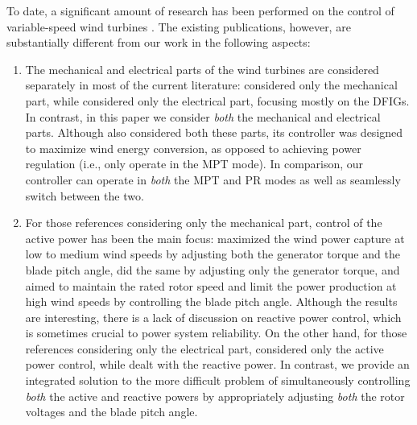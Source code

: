 \documentclass[journal]{IEEEtran}
\begin{document}
To date, a significant amount of research has been performed on the control of variable-speed wind turbines \cite{Prats00,Iyasere08,Johnson04b,Johnson06,Calderaro07,Galdi08,Chedid00,Beltran08,Malinga03,Hand99,ZhangL08,GengH09,Muljadi01,Senjyu06,Stol01,Wright03,Wright03b,ZhangJZ08,Janssens07,Tarnowski07,Ko07,Brekken03,Marinescu04,LiDD04,ZhiDW07,WuF08, Alegria04,Pena96,Hopfensperger00,Monroy08,Peresada04,Rabelo01,LiH06,Hansen04}. The existing publications, however, are substantially different from our work in the following aspects:
\begin{enumerate}
\itemsep-\parsep

\item The mechanical and electrical parts of the wind turbines are considered separately in most of the current literature: \cite{Iyasere08,Malinga03,Hand99,Chedid00,Prats00,Johnson04b,Johnson06,Beltran08,Galdi08,GengH09,Muljadi01,Senjyu06,Stol01,Wright03,Wright03b,ZhangL08,ZhangJZ08,Calderaro07} considered only the mechanical part, while \cite{Ko07,Janssens07,ZhiDW07,Marinescu04,Tarnowski07,WuF08,Pena96,Monroy08,Peresada04,LiDD04,Brekken03,Alegria04,Hopfensperger00,Rabelo01,LiH06} considered only the electrical part, focusing mostly on the DFIGs. In contrast, in this paper we consider {\em both} the mechanical and electrical parts. Although \cite{Hansen04} also considered both these parts, its controller was designed to maximize wind energy conversion, as opposed to achieving power regulation (i.e., only operate in the MPT mode). In comparison, our controller can operate in {\em both} the MPT and PR modes as well as seamlessly switch between the two.
\item For those references \cite{Iyasere08,Malinga03,Hand99,Chedid00,Prats00,Johnson04b,Johnson06,Beltran08,Galdi08,GengH09,Muljadi01,Senjyu06,Stol01,Wright03,Wright03b,ZhangL08,ZhangJZ08,Calderaro07} considering only the mechanical part, control of the active power has been the main focus: \cite{Iyasere08,Prats00} maximized the wind power capture at low to medium wind speeds by adjusting both the generator torque and the blade pitch angle, \cite{Johnson04b,Johnson06,Galdi08,Calderaro07} did the same by adjusting only the generator torque, and \cite{Hand99,GengH09,Muljadi01,Senjyu06,Stol01,Wright03,Wright03b,ZhangL08,ZhangJZ08} aimed to maintain the rated rotor speed and limit the power production at high wind speeds by controlling the blade pitch angle. Although the results are interesting, there is a lack of discussion on reactive power control, which is sometimes crucial to power system reliability. On the other hand, for those references \cite{Ko07,Janssens07,ZhiDW07,Marinescu04,Tarnowski07,WuF08,Pena96,Monroy08,Peresada04,LiDD04,Brekken03,Alegria04,Hopfensperger00,Rabelo01,LiH06} considering only the electrical part, \cite{Janssens07,Tarnowski07} considered only the active power control, while \cite{Ko07,Marinescu04,LiDD04,Brekken03} dealt with the reactive power. In contrast, we provide an integrated solution to the more difficult problem of simultaneously controlling {\em both} the active and reactive powers by appropriately adjusting {\em both} the rotor voltages and the blade pitch angle.

\end{enumerate}
\end{document}
